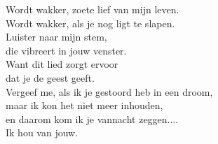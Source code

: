 \clearpage
\begin{translation}
Wordt wakker, zoete lief van mijn leven.\\
Wordt wakker, als je nog ligt te slapen.\\
Luister naar mijn stem,\\
die vibreert in jouw venster.\\
Want dit lied zorgt ervoor\\
dat je de geest geeft.\\
\vspace*{1\baselineskip}
Vergeef me, als ik je gestoord heb in een droom,\\
maar ik kon het niet meer inhouden,\\
en daarom kom ik je vannacht zeggen....\\
Ik hou van jouw.\\
\end{translation}
